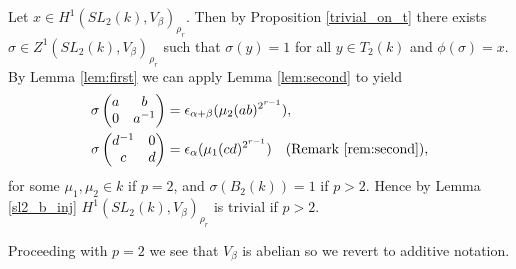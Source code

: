 Let $x\in H^1(SL_2(k), V_\beta)_{\rho_r}$. Then by Proposition \ref{trivial_on_t} there exists $\sigma \in Z^1(SL_2(k), V_\beta)_{\rho_r}$ such that $\sigma(y) = 1$ for all  $y\in T_2(k)$ and $\phi(\sigma) = x$. By Lemma \ref{lem:first} we can apply Lemma \ref{lem:second} to yield
\begin{align*}
\sigma\left(\begin{matrix}a & b\\0 & a^{-1}\end{matrix}\right) &= \epsilon_{\alpha+\beta}(\mu_2(ab)^{2^{r-1}}),\\
\sigma\left(\begin{matrix}d^{-1} & 0\\c & d\end{matrix}\right) &= \epsilon_{\alpha}(\mu_1(cd)^{2^{r-1}}) \quad\textrm{(Remark \ref{rem:second})},
\end{align*}
for some $\mu_1,\mu_2 \in k$ if $p = 2$, and $\sigma(B_2(k)) = 1$ if $p>2$. Hence by Lemma \ref{sl2_b_inj} $H^1(SL_2(k), V_\beta)_{\rho_r}$ is trivial if $p > 2$.

Proceeding with $p=2$ we see that $V_\beta$ is abelian so we revert to additive notation.

